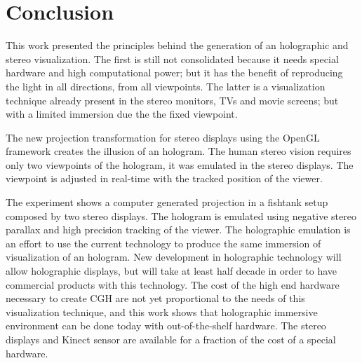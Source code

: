 \section{Conclusion}
\label{sec.conclusion}

This work presented the principles behind the generation of an holographic and stereo visualization. The first is still not consolidated because it needs special hardware and high computational power; but it has the benefit of reproducing the light in all directions, from all viewpoints. The latter is a visualization technique already present in the stereo monitors, TVs and movie screens; but with a limited immersion due the the fixed viewpoint.

The new projection transformation for stereo displays using the OpenGL framework creates the illusion of an hologram. The human stereo vision requires only two viewpoints of the hologram, it was emulated in the stereo displays. The viewpoint is adjusted in real-time with the tracked position of the viewer.

The experiment shows a computer generated projection in a fishtank setup composed by two stereo displays. The hologram is emulated using negative stereo parallax and high precision tracking of the viewer. The holographic emulation is an effort to use the current technology to produce the same immersion of visualization of an hologram. New development in holographic technology will allow holographic displays, but will take at least half decade in order to have commercial products with this technology. The cost of the high end hardware necessary to create CGH are not yet proportional to the needs of this visualization technique, and this work shows that holographic immersive environment can be done today with out-of-the-shelf hardware. The  stereo displays and Kinect sensor are available for a fraction of the cost of a special hardware.

